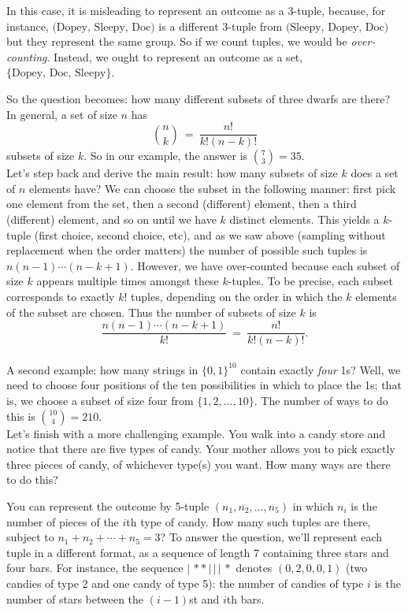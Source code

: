 \documentclass{report}
\theoremstyle{plain}
\theoremstyle{definition}
\begin{document}
In this case, it is misleading to represent an outcome as a 3-tuple, because, 
for instance, $\mbox{(Dopey, Sleepy, Doc)}$ is a different 3-tuple from
$\mbox{(Sleepy, Dopey, Doc)}$ but they represent the same group. So if we count
tuples, we would be {\it over-counting}. Instead, we ought to represent an 
outcome as a set, $ \{\mbox{Dopey, Doc, Sleepy}\}$.

So the question becomes: how many different subsets of three dwarfs are there?
In general, a set of size $n$ has 
$${n \choose k} \ = \ \frac{n!}{k! (n-k)!} $$ 
subsets of size $k$. So in our example, the answer is ${7 \choose 3} = 35$.
\\

Let's step back and derive the main result: how many subsets of size $k$ does a
set of $n$ elements have? We can choose the subset in the following manner: first
pick one element from the set, then a second (different) element, then a third 
(different) element, and so on until we have $k$ distinct elements. This yields 
a $k$-tuple (first choice, second choice, etc), and as we saw above (sampling
without replacement when the order matters) the number of possible such tuples 
is $n(n-1) \cdots (n-k+1)$. However, we have over-counted because each subset of 
size $k$ appears multiple times amongst these $k$-tuples. To be precise, each 
subset corresponds to exactly $k!$ tuples, depending on the order in which the 
$k$ elements of the subset are chosen. Thus the number of subsets of size $k$ is
$$ \frac{n(n-1)\cdots (n-k+1)}{k!} \ = \ \frac{n!}{k!(n-k)!} .$$
\\

A second example: how many strings in $\{0,1\}^{10}$ contain exactly
{\it four} 1s?  Well, we need to choose four positions of the ten
possibilities in which to place the 1s; that is, we choose a subset of
size four from $\{1,2,\ldots,10\}$.  The number of ways to do this is
${10 \choose 4} = 210$.
\\

Let's finish with a more challenging example. You walk into a candy
store and notice that there are five types of candy. Your mother
allows you to pick exactly three pieces of candy, of whichever type(s)
you want. How many ways are there to do this?

You can represent the outcome by 5-tuple $(n_1, n_2, \ldots, n_5)$ in
which $n_i$ is the number of pieces of the $i$th type of candy. How
many such tuples are there, subject to $n_1 + n_2 + \cdots + n_5 = 3$?
To answer the question, we'll represent each tuple in a different
format, as a sequence of length 7 containing three stars and four
bars. For instance, the sequence $|\,**\,|\,|\,|\,*$ denotes
$(0,2,0,0,1)$ (two candies of type 2 and one candy of type 5): the
number of candies of type $i$ is the number of stars between the
$(i-1)$st and $i$th bars.
 
\end{document}
